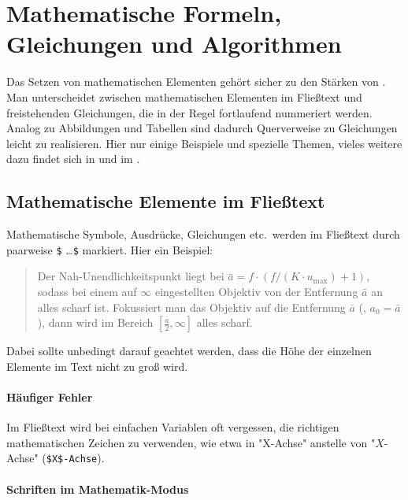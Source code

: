 \chapter[Mathem.\ Formeln etc.]{Mathematische Formeln, Gleichungen und Algorithmen}
\label{cha:Mathematik}

Das Setzen von mathematischen Elementen gehört sicher zu den Stär\-ken
von \latex. Man unterscheidet zwischen mathematischen Elementen im Fließtext
und freistehenden Gleichungen, die in der Regel fortlaufend nummeriert werden.
Analog zu Abbildungen und Tabellen sind dadurch Querverweise zu Gleichungen
leicht zu realisieren. Hier nur einige Beispiele und spezielle Themen, vieles
weitere dazu findet sich \zB in \cite[Kap.\ 7]{Kopka2003} und im
 \cite{Downes2017}.


\section{Mathematische Elemente im Fließtext}

Mathematische Symbole, Ausdrücke, Gleichungen etc.\ werden im Fließtext durch
paarweise \verb!$! \ldots \verb!$! markiert. Hier ein Beispiel:
%
\begin{quote}
	Der Nah-Unendlichkeitspunkt liegt bei
	$\bar{a} = f \cdot (f / (K \cdot u_{\max}) + 1)$,
	sodass bei einem auf $\infty$ eingestellten Objektiv von der Entfernung
	$\bar{a}$ an alles scharf ist. Fokussiert man das Objektiv auf die
	Entfernung $\bar{a}$ (\dah, $a_0 = \bar{a}$), dann wird im Bereich
	$[\frac{\bar{a}}{2}, \infty]$ alles scharf.
\end{quote}
%
Dabei sollte unbedingt darauf geachtet werden, dass die Höhe der einzelnen
Elemente im Text nicht zu groß wird.

\subsubsection{Häufiger Fehler}

Im Fließtext wird bei einfachen Variablen oft vergessen, die richtigen
mathematischen Zeichen zu verwenden, wie etwa in "X-Achse" anstelle von
"$X$-Achse" (\verb!$X$-Achse!).


\subsubsection{Schriften im Mathematik-Modus}

